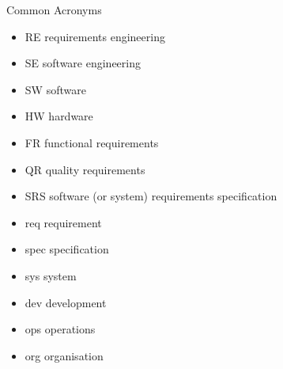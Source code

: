 
\begin{Slide}{Common Acronyms}

\begin{itemize}
\item RE   \hfill requirements engineering
\item SE   \hfill software engineering
\item SW   \hfill software
\item HW   \hfill hardware
\item FR   \hfill functional requirements
\item QR   \hfill quality requirements
\item SRS  \hfill software (or system) requirements specification
\item req  \hfill requirement 
\item spec \hfill specification
\item sys  \hfill system
\item dev  \hfill development
\item ops  \hfill operations
\item org  \hfill organisation


\end{itemize}
\end{Slide}